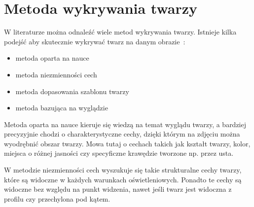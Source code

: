 \documentclass[a4paper,twoside,12pt]{book}
\begin{document}
    \section{Metoda wykrywania twarzy}\label{sec:metodaWykrywaniaTwarzy}
    W literaturze można odnaleźć wiele metod wykrywania twarzy.
    Istnieje kilka podejść aby skutecznie wykrywać twarz na danym obrazie~\cite{mehdiRizvi}:

    \begin{itemize}
        \item metoda oparta na nauce
        \item metoda niezmienności cech
        \item metoda dopasowania szablonu twarzy
        \item metoda bazująca na wyglądzie
    \end{itemize}
    Metoda oparta na nauce kieruje się wiedzą na temat wyglądu twarzy, a
    bardziej precyzyjnie chodzi o charakterystyczne cechy,
    dzięki którym na zdjęciu można wyodrębnić obszar twarzy.
    Mowa tutaj o cechach takich jak kształt twarzy, kolor, miejsca o różnej jasności czy specyficzne krawędzie
    tworzone np. przez
    usta.

    W metodzie niezmienności cech wyszukuje się takie strukturalne cechy twarzy, które są widoczne w każdych warunkach
    oświetleniowych.
    Ponadto te cechy są widoczne bez względu na punkt widzenia, nawet jeśli twarz jest widoczna
    z profilu czy przechylona pod kątem.
\end{document}
